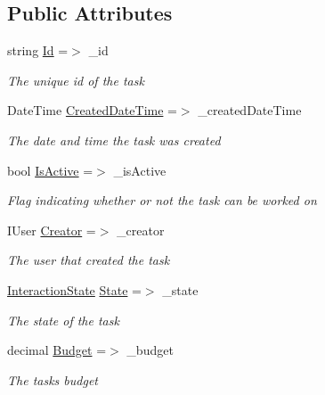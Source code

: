 \subsection*{Public Attributes}
\begin{DoxyCompactItemize}
\item 
string \hyperlink{class_plex_byte_1_1_mo_cap_1_1_interactions_1_1_task_a56373e896c8d387f53b89c820b78686c}{Id} =$>$ \+\_\+id
\begin{DoxyCompactList}\small\item\em The unique id of the task \end{DoxyCompactList}\item 
Date\+Time \hyperlink{class_plex_byte_1_1_mo_cap_1_1_interactions_1_1_task_ad09e75c883291d7bf2a5be651c2e48f5}{Created\+Date\+Time} =$>$ \+\_\+created\+Date\+Time
\begin{DoxyCompactList}\small\item\em The date and time the task was created \end{DoxyCompactList}\item 
bool \hyperlink{class_plex_byte_1_1_mo_cap_1_1_interactions_1_1_task_a4e3e7f12d9ebbef619979f8aa1debaa9}{Is\+Active} =$>$ \+\_\+is\+Active
\begin{DoxyCompactList}\small\item\em Flag indicating whether or not the task can be worked on \end{DoxyCompactList}\item 
I\+User \hyperlink{class_plex_byte_1_1_mo_cap_1_1_interactions_1_1_task_a8fbe07ee1d4f0d20465aa6eb78dd5959}{Creator} =$>$ \+\_\+creator
\begin{DoxyCompactList}\small\item\em The user that created the task \end{DoxyCompactList}\item 
\hyperlink{namespace_plex_byte_1_1_mo_cap_1_1_interactions_afcb673d9186608b6bd3b187179aedc8a}{Interaction\+State} \hyperlink{class_plex_byte_1_1_mo_cap_1_1_interactions_1_1_task_ade847c2f68b897a4eae7463134aadaa1}{State} =$>$ \+\_\+state
\begin{DoxyCompactList}\small\item\em The state of the task \end{DoxyCompactList}\item 
decimal \hyperlink{class_plex_byte_1_1_mo_cap_1_1_interactions_1_1_task_a754524cdae030db2de7d38cae665ed7e}{Budget} =$>$ \+\_\+budget
\begin{DoxyCompactList}\small\item\em The tasks budget \end{DoxyCompactList}\item 

\end{DoxyCompactItemize}
